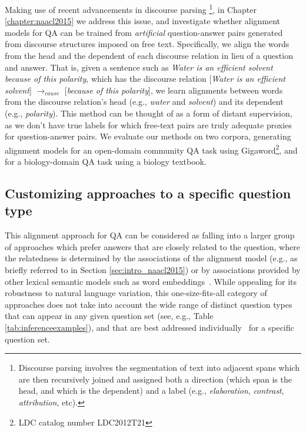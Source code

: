 Making use of recent advancements in discourse parsing \citep{feng12}\footnote{Discourse parsing involves the segmentation of text into adjacent spans which are then recursively joined and assigned both a direction (which span is the head, and which is the dependent) and a label (e.g., \emph{elaboration}, \emph{contrast}, \emph{attribution}, etc).},  
in Chapter \ref{chapter:naacl2015} we address this issue, and investigate whether alignment models for QA can be trained from \emph{artificial} question-answer pairs generated from discourse structures  imposed on free text.  Specifically, we align the words from the head and the dependent of each discourse relation in lieu of a question and answer.  That is, given a sentence such as \textit{Water is an efficient solvent because of this polarity}, which has the discourse relation [\textit{Water is an efficient solvent}] $\rightarrow_{cause}$ [\textit{because of this polarity}], we learn alignments between words from the discourse relation's head (e.g., \textit{water} and \textit{solvent}) and its dependent (e.g., \textit{polarity}).
This method can be thought of as a form of distant supervision, as we don't have true labels for which free-text pairs are truly adequate proxies for question-answer pairs.
We evaluate our methods on two corpora, generating alignment models for an open-domain community QA task using Gigaword\footnote{LDC catalog number LDC2012T21}, and for a biology-domain QA task using a biology textbook. 


\subsection{Customizing approaches to a specific question type}
\label{sec:intro_emnlp2016}

This alignment approach for QA can be considered as falling into a larger group of approaches which prefer answers that are closely related to the question, where the relatedness is determined by the associations of the alignment model (e.g., as briefly referred to in Section \ref{sec:intro_naacl2015}) or by associations provided by other lexical semantic models such as word embeddings~\citep{yih13,jansen14,fried2015higher}. 
While appealing for its robustness to natural language variation, this one-size-fits-all category of approaches does not take into account the wide range of distinct question types that can appear in any given question set (see, e.g.,  Table \ref{tab:inferenceexamples}), and that are best addressed individually~\citep{chu2004ibm,ferrucci2010building,clark2013study} for a specific question set.  

